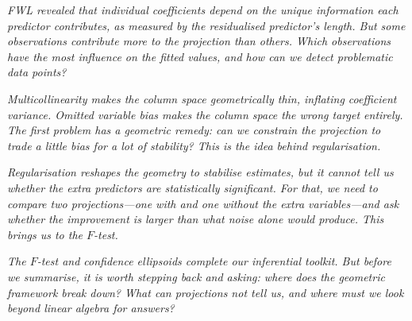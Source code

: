 
\medskip
\noindent\textit{FWL revealed that individual coefficients depend on
the unique information each predictor contributes, as measured by
the residualised predictor's length.
But some observations contribute more to the projection than others.
Which observations have the most influence on the fitted values,
and how can we detect problematic data points?}



\medskip
\noindent\textit{Multicollinearity makes the column space geometrically
thin, inflating coefficient variance.
Omitted variable bias makes the column space the wrong target entirely.
The first problem has a geometric remedy: can we \emph{constrain}
the projection to trade a little bias for a lot of stability?
This is the idea behind regularisation.}



\medskip
\noindent\textit{Regularisation reshapes the geometry to stabilise
estimates, but it cannot tell us whether the extra predictors are
\emph{statistically significant}.
For that, we need to compare two projections---one with and one
without the extra variables---and ask whether the improvement is
larger than what noise alone would produce.
This brings us to the $F$-test.}



\medskip
\noindent\textit{The $F$-test and confidence ellipsoids complete our
inferential toolkit.
But before we summarise, it is worth stepping back and asking:
where does the geometric framework \emph{break down}?
What can projections not tell us, and where must we look beyond
linear algebra for answers?}


